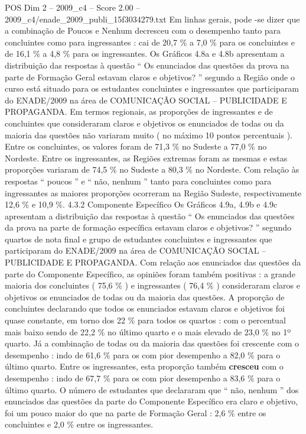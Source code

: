 \begin{textsample}{POS Dim 2 – 2009\_c4 – Score 2.00 – 2009\_c4/enade\_2009\_publi\_15f3034279.txt}
Em linhas gerais, pode -se dizer que a combinação de Poucos e Nenhum decresceu com o desempenho tanto para concluintes como para ingressantes : cai de 20,7 \% a 7,0 \% para os concluintes e de 16,1 \% a 4,8 \% para os ingressantes.
Os Gráficos 4.8a e 4.8b apresentam a distribuição das respostas à questão “ Os enunciados das questões da prova na parte de Formação Geral estavam claros e objetivos? ” segundo a Região onde o curso está situado para os estudantes concluintes e ingressantes que participaram do ENADE/2009 na área de COMUNICAÇÃO SOCIAL – PUBLICIDADE E PROPAGANDA.
Em termos regionais, as proporções de ingressantes e de concluintes que consideraram claros e objetivos os enunciados de todas ou da maioria das questões não variaram muito ( no máximo 10 pontos percentuais ).
Entre os concluintes, os valores foram de 71,3 \% no Sudeste a 77,0 \% no Nordeste.
Entre os ingressantes, as Regiões extremas foram as mesmas e estas proporções variaram de 74,5 \% no Sudeste a 80,3 \% no Nordeste.
Com relação às respostas “ poucos ” e “ não, nenhum ” tanto para concluintes como para ingressantes as maiores proporções ocorreram na Região Sudeste, respectivamente 12,6 \% e 10,9 \%. 4.3.2 Componente Específico Os Gráficos 4.9a, 4.9b e 4.9c apresentam a distribuição das respostas à questão “ Os enunciados das questões da prova na parte de formação específica estavam claros e objetivos? ” segundo quartos de nota final e grupo de estudantes concluintes e ingressantes que participaram do ENADE/2009 na área de COMUNICAÇÃO SOCIAL – PUBLICIDADE E PROPAGANDA.
Com relação aos enunciados das questões da parte do Componente Específico, as opiniões foram também positivas : a grande maioria dos concluintes ( 75,6 \% ) e ingressantes ( 76,4 \% ) consideraram claros e objetivos os enunciados de todas ou da maioria das questões.
A proporção de concluintes declarando que todos os enunciados estavam claros e objetivos foi quase constante, em torno dos 22 \% para todos os quartos : com o percentual mais baixo sendo de 22,2 \% no último quarto e o mais elevado de 23,0 \% no 1º quarto.
Já a combinação de todas ou da maioria das questões foi crescente com o desempenho : indo de 61,6 \% para os com pior desempenho a 82,0 \% para o último quarto.
Entre os ingressantes, esta proporção também \textbf{cresceu} com o desempenho : indo de 67,7 \% para os com pior desempenho a 83,6 \% para o último quarto.
O número de estudantes que declararam que “ não, nenhum ” dos enunciados das questões da parte do Componente Específico era claro e objetivo, foi um pouco maior do que na parte de Formação Geral : 2,6 \% entre os concluintes e 2,0 \% entre os ingressantes.

\end{textsample}

